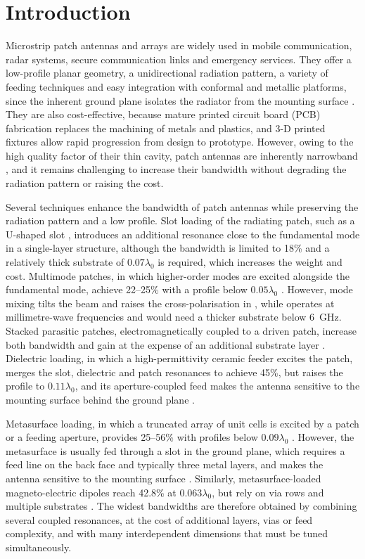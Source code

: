 \documentclass[conference,a4paper]{IEEEtran}
\begin{document}
\section{Introduction}
Microstrip patch antennas and arrays are widely used in mobile communication, radar systems, secure communication links and emergency services. They offer a low-profile planar geometry, a unidirectional radiation pattern, a variety of feeding techniques and easy integration with conformal and metallic platforms, since the inherent ground plane isolates the radiator from the mounting surface \cite{Garg2001, Balanis2016}. They are also cost-effective, because mature printed circuit board (PCB) fabrication replaces the machining of metals and plastics, and 3-D printed fixtures allow rapid progression from design to prototype. However, owing to the high quality factor of their thin cavity, patch antennas are inherently narrowband \cite{Lo2025}, and it remains challenging to increase their bandwidth without degrading the radiation pattern or raising the cost.

Several techniques enhance the bandwidth of patch antennas while preserving the radiation pattern and a low profile. Slot loading of the radiating patch, such as a U-shaped slot \cite{Wang2008}, introduces an additional resonance close to the fundamental mode in a single-layer structure, although the bandwidth is limited to 18\% and a relatively thick substrate of $0.07\lambda_0$ is required, which increases the weight and cost. Multimode patches, in which higher-order modes are excited alongside the fundamental mode, achieve 22--25\% with a profile below $0.05\lambda_0$ \cite{Lu2018, Jouybari2026}. However, mode mixing tilts the beam and raises the cross-polarisation in \cite{Lu2018}, while \cite{Jouybari2026} operates at millimetre-wave frequencies and would need a thicker substrate below 6~GHz. Stacked parasitic patches, electromagnetically coupled to a driven patch, increase both bandwidth and gain at the expense of an additional substrate layer \cite{Legay1993}. Dielectric loading, in which a high-permittivity ceramic feeder excites the patch, merges the slot, dielectric and patch resonances to achieve 45\%, but raises the profile to $0.11\lambda_0$, and its aperture-coupled feed makes the antenna sensitive to the mounting surface behind the ground plane \cite{Lo2025}.

Metasurface loading, in which a truncated array of unit cells is excited by a patch or a feeding aperture, provides 25--56\% with profiles below $0.09\lambda_0$ \cite{Lin2018, Lin2021, Zhou2022, Gao2026, Naik2025}. However, the metasurface is usually fed through a slot in the ground plane, which requires a feed line on the back face and typically three metal layers, and makes the antenna sensitive to the mounting surface \cite{Lin2021, Zhou2022, Gao2026}. Similarly, metasurface-loaded magneto-electric dipoles reach 42.8\% at $0.063\lambda_0$, but rely on via rows and multiple substrates \cite{Li2026}. The widest bandwidths are therefore obtained by combining several coupled resonances, at the cost of additional layers, vias or feed complexity, and with many interdependent dimensions that must be tuned simultaneously.
\end{document}
